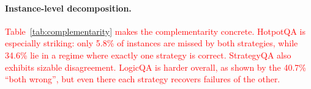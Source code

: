 \documentclass[11pt]{article}
\begin{document}
\begin{table}[ht]
\centering
\small
{}
\caption{Instance-level complementarity decomposition. ``CoT only'' means CoT is correct and A* is wrong; ``A* only'' means the reverse.}
\label{tab:complementarity}
\end{table}

\paragraph{Instance-level decomposition.}
\textcolor{red}{Table~\ref{tab:complementarity} makes the complementarity concrete. HotpotQA is especially striking: only 5.8\% of instances are missed by both strategies, while 34.6\% lie in a regime where exactly one strategy is correct. StrategyQA also exhibits sizable disagreement. LogicQA is harder overall, as shown by the 40.7\% ``both wrong'', but even there each strategy recovers failures of the other.}




\end{document}
